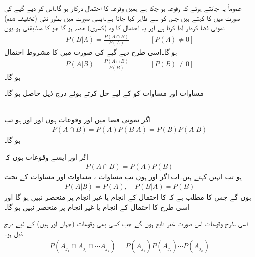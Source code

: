 عموماً یہ جانتے ہوئے کہ وقوعہ  ہو چکا ہے ہمیں وقوعہ  کا احتمال درکار ہو گا۔اس کو دیے گیے  کی صورت میں  کا    کہتے ہیں جس کو  سے ظاہر کیا جاتا ہے۔ایسی صورت میں  بطور  نئی (تخفیف شدہ) نمونی فضا کردار ادا کرتا ہے اور یہ احتمال  کا وہ  (کسری) حصہ ہو گا جو  کا مطابقتی ہو۔یوں
\begin{align}\label{مساوات_شماریات_مشروط_احتمال_الف}
P(B|A)=\frac{P(A\cap B)}{P(A)}\quad\quad\quad [P(A)\ne 0]
\end{align}  
ہو گا۔اسی طرح دیے گیے  کی صورت میں  کا مشروط احتمال 
\begin{align}\label{مساوات_شماریات_مشروط_احتمال_ب}
P(A|B)=\frac{P(A\cap B)}{P(B)}\quad\quad\quad [P(B)\ne 0]
\end{align}
ہو گا۔

مساوات  اور مساوات  کو  کے لیے حل کرتے ہوئے درج ذیل حاصل ہو گا۔

\quad {}\\
اگر نمونی فضا  میں  اور  وقوعات ہوں اور  اور  ہو تب 
\begin{align}\label{مساوات_شماریات_مشروط_احتمال_پ}
P(A\cap B)=P(A)P(B|A)=P(B)P(A|B)
\end{align}
ہو گا۔

اگر  اور  ایسے وقوعات ہوں کہ 
\begin{align}\label{مساوات_شماریات_مشروط_احتمال_ت}
P(A\cap B)=P(A)P(B)
\end{align}
ہو تب انہیں  کہتے ہیں۔اب اگر  اور  ہوں تب مساوات ، مساوات  اور مساوات  کے تحت 
\begin{align*}
P(A|B)=P(A),\quad P(B|A)=P(B)
\end{align*}
ہوں گے جس کا مطلب ہے کہ  کا احتمال  کے انجام یا غیر انجام پر منحصر نہیں ہو گا اور اسی طرح  کا احتمال  کے انجام یا غیر انجام پر منحصر نہیں ہو گا۔

اسی طرح  وقوعات  اس صورت غیر تابع ہوں گے جب کسی  بھی  وقوعات  (جہاں  اور  ہیں) کے لیے درج ذیل ہو۔
\begin{align}
P(A_{j_1}\cap A_{j_2}\cap \cdots A_{j_k})=P(A_{j_1})P(A_{j_2})\cdots P(A_{j_k})
\end{align}

